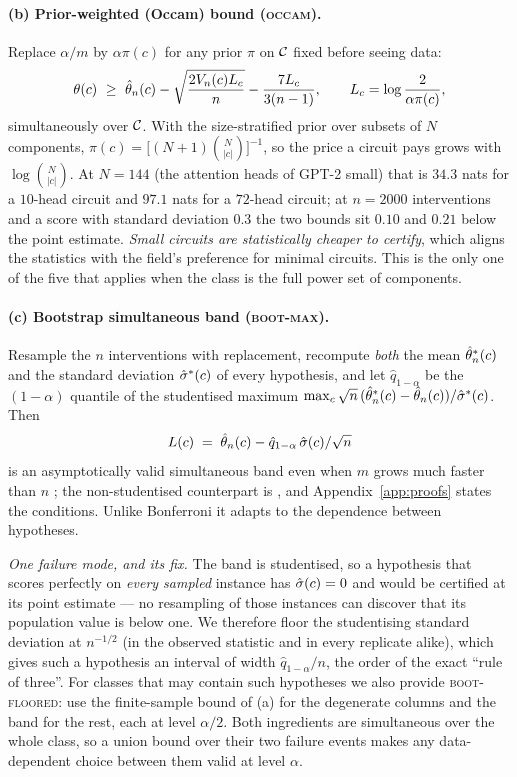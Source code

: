 \paragraph{(b) Prior-weighted (Occam) bound (\textsc{occam}).}
Replace $\alpha/m$ by $\alpha\pi(c)$ for any prior $\pi$ on $\mathcal{C}$ fixed
before seeing data:
\[
\theta(c)\ \ge\ \thetahat_n(c)-\sqrt{\frac{2V_n(c)L_c}{n}}-\frac{7L_c}{3(n-1)},
\qquad L_c=\log\frac{2}{\alpha\pi(c)},
\]
simultaneously over $\mathcal{C}$. With the size-stratified prior over subsets of $N$
components, $\pi(c)=\big[(N{+}1)\binom{N}{|c|}\big]^{-1}$, so
the price a circuit pays grows with $\log\binom{N}{|c|}$. At $N=144$ (the
attention heads of GPT-2 small) that is $34.3$ nats for a $10$-head circuit and
$97.1$ nats for a $72$-head circuit; at $n=2000$ interventions and a score with
standard deviation $0.3$ the two bounds sit $0.10$ and $0.21$ below the point
estimate. \emph{Small circuits are statistically cheaper to certify}, which aligns
the statistics with the field's preference for minimal circuits. This is the only
one of the five that applies when the class is the full power set of
components.

\paragraph{(c) Bootstrap simultaneous band (\textsc{boot-max}).}
Resample the $n$ interventions with replacement, recompute \emph{both} the mean
$\hat{\theta}^{*}_n(c)$ and the standard deviation $\hat{\sigma}^{*}(c)$ of every
hypothesis, and let $\hat q_{1-\alpha}$ be the $(1-\alpha)$ quantile of the
studentised maximum
$\max_c \sqrt n\,(\hat{\theta}^{*}_n(c)-\hat{\theta}_n(c))/\hat{\sigma}^{*}(c)$. Then
\[
L(c)\;=\;\hat{\theta}_n(c)-\hat q_{1-\alpha}\,\hat{\sigma}(c)/\sqrt n
\]
is an asymptotically valid simultaneous band even when $m$ grows much faster
than $n$ \citep[Thm.~4.3]{cck2019moment}; the non-studentised counterpart is
\citet[Cor.~3.1]{chernozhukov2013gaussian}, and Appendix~\ref{app:proofs} states
the conditions. Unlike Bonferroni it adapts to the dependence between
hypotheses.

\emph{One failure mode, and its fix.} The band is studentised, so a hypothesis
that scores perfectly on \emph{every sampled} instance has $\hat{\sigma}(c)=0$ and
would be certified at its point estimate --- no resampling of those instances can
discover that its population value is below one. We therefore floor the
studentising standard deviation at $n^{-1/2}$ (in the observed statistic and in
every replicate alike), which gives such a hypothesis an interval of width
$\hat q_{1-\alpha}/n$, the order of the exact ``rule of three''. For classes that
may contain such hypotheses we also provide \textsc{boot-floored}: use the
finite-sample bound of (a) for the degenerate columns and the band for the rest,
each at level $\alpha/2$. Both ingredients are simultaneous over the whole class,
so a union bound over their two failure events makes any data-dependent choice
between them valid at level $\alpha$.

